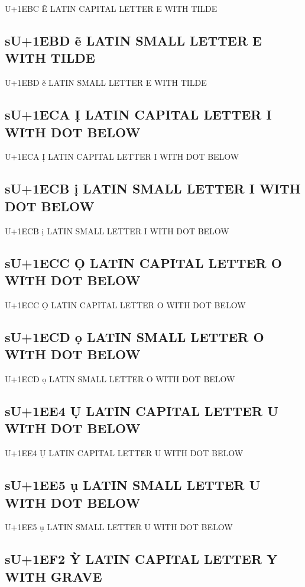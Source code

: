 U+1EBC Ẽ LATIN CAPITAL LETTER E WITH TILDE

\subsection{sU+1EBD ẽ LATIN SMALL LETTER E WITH TILDE}

U+1EBD ẽ LATIN SMALL LETTER E WITH TILDE

\subsection{sU+1ECA Ị LATIN CAPITAL LETTER I WITH DOT BELOW}

U+1ECA Ị LATIN CAPITAL LETTER I WITH DOT BELOW

\subsection{sU+1ECB ị LATIN SMALL LETTER I WITH DOT BELOW}

U+1ECB ị LATIN SMALL LETTER I WITH DOT BELOW

\subsection{sU+1ECC Ọ LATIN CAPITAL LETTER O WITH DOT BELOW}

U+1ECC Ọ LATIN CAPITAL LETTER O WITH DOT BELOW

\subsection{sU+1ECD ọ LATIN SMALL LETTER O WITH DOT BELOW}

U+1ECD ọ LATIN SMALL LETTER O WITH DOT BELOW

\subsection{sU+1EE4 Ụ LATIN CAPITAL LETTER U WITH DOT BELOW}

U+1EE4 Ụ LATIN CAPITAL LETTER U WITH DOT BELOW

\subsection{sU+1EE5 ụ LATIN SMALL LETTER U WITH DOT BELOW}

U+1EE5 ụ LATIN SMALL LETTER U WITH DOT BELOW

\subsection{sU+1EF2 Ỳ LATIN CAPITAL LETTER Y WITH GRAVE}


